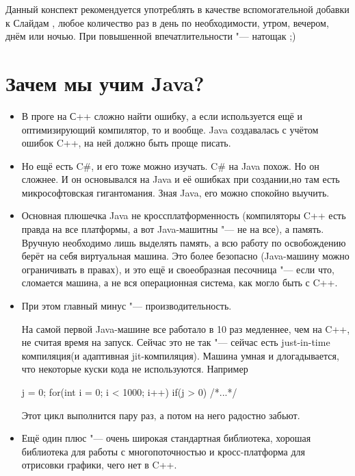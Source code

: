 Данный конспект рекомендуется употреблять в качестве вспомогательной добавки к Слайдам%
, любое количество раз в день по необходимости, утром, вечером, днём или ночью.
При повышенной впечатлительности "--- натощак ;)

\section{Зачем мы учим Java?}

\begin{itemize}
\item
	В проге на С++ сложно найти ошибку, а если используется ещё и оптимизирующий компилятор, то и вообще.
	Java создавалась с учётом ошибок C++, на ней должно быть проще писать.

\item
	Но ещё есть C\#, и его тоже можно изучать.
	C\# на Java похож. Но он сложнее.
	И он основывался на Java и её ошибках при создании,но там есть микрософтовская гигантомания.
	Зная Java, его можно спокойно выучить.

\item
	Основная плюшечка Java не кроссплатформенность
	(компиляторы C++ есть правда на все платформы, а вот Java-машитны "--- не на все), а память.
	Вручную необходимо лишь выделять память, а всю работу по освобождению берёт на себя виртуальная машина.
	Это более безопасно (Java-машину можно ограничивать в правах),
	и это ещё и своеобразная песочница "--- если что, сломается машина, а не вся операционная система, как могло быть с C++.

\item
	При этом главный минус "--- производительность.

	На самой первой Java-машине все работало в 10 раз медленнее, чем на C++, не считая время на запуск.
	Сейчас это не так "--- сейчас есть just-in-time компиляция(и адаптивная jit-компиляция).
	Машина умная и длогадывается, что некоторые куски кода не используются.
	Например
	\begin{javacode}
		j = 0;
		for(int i = 0; i < 1000; i++) {
			if(j > 0) {
				/*...*/
			}
		}
	\end{javacode}
	Этот цикл выполнится пару раз, а потом на него радостно забьют.

\item
	Ещё один плюс "--- очень широкая стандартная библиотека, хорошая библиотека для работы с многопоточностью и
	кросс-платформа для отрисовки графики, чего нет в C++.
\end{itemize}

